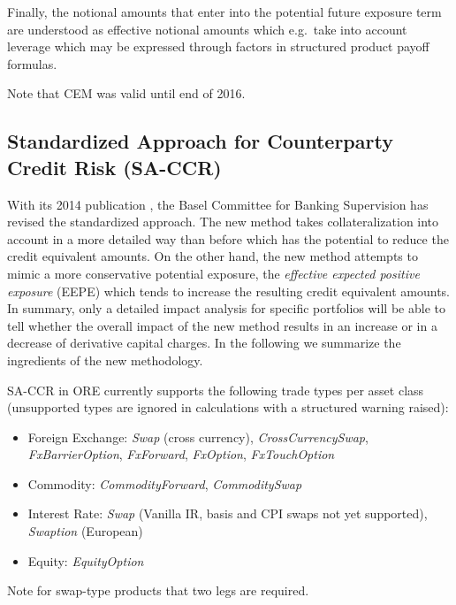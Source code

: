 Finally, the notional amounts that enter into the potential future
exposure term are understood as effective notional amounts which
e.g.\ take into account leverage which may be expressed through
factors in structured product payoff formulas. 

\medskip
\noindent 
Note that CEM was valid until end of 2016.

\subsection{Standardized Approach for Counterparty Credit Risk (SA-CCR)}

With its 2014 publication \cite{bcbs279}, the Basel Committee for
Banking Supervision has revised  the standardized approach. The new
method takes collateralization into account in a more detailed way
than before which has the potential to reduce the credit equivalent
amounts. On the other hand, the new method attempts to mimic a more
conservative potential exposure, the {\em effective expected positive
exposure} (EEPE) which tends to increase the resulting credit
equivalent amounts. In summary, only a detailed impact analysis for
specific portfolios will be able to tell whether the overall impact of
the new method results in an increase or in a decrease of derivative capital charges.
In the following we summarize the ingredients of the new methodology.

SA-CCR in ORE currently supports the following trade types per asset class (unsupported
types are ignored in calculations with a structured warning raised): \begin{itemize}
  \item Foreign Exchange: \emph{Swap} (cross currency), \emph{CrossCurrencySwap}, \emph{FxBarrierOption}, \emph{FxForward}, \emph{FxOption}, \emph{FxTouchOption}
  \item Commodity: \emph{CommodityForward}, \emph{CommoditySwap}
  \item Interest Rate: \emph{Swap} (Vanilla IR, basis and CPI swaps not yet supported), \emph{Swaption} (European)
  \item Equity: \emph{EquityOption}
\end{itemize}

Note for swap-type products that two legs are required.

